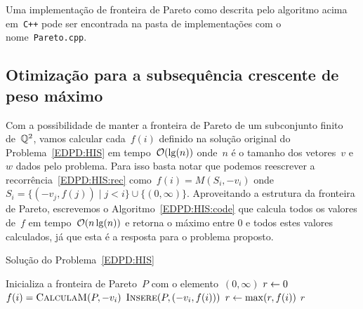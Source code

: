 Uma implementação de fronteira de Pareto como descrita pelo algoritmo acima em~\texttt{C++} pode ser encontrada na pasta de implementações com o nome~\texttt{Pareto.cpp}.



\subsection{Otimização para a subsequência crescente de peso máximo}

Com a possibilidade de manter a fronteira de Pareto de um subconjunto finito de~$\mathbb{Q}^2$, vamos calcular cada~$f(i)$ definido na solução original do Problema~\ref{EDPD:HIS} em tempo~$\mathcal{O}(\lg(n))$ onde~$n$ é o tamanho dos vetores~$v$ e~$w$ dados pelo problema. Para isso basta notar que podemos reescrever a recorrência~\eqref{EDPD:HIS:rec} como~$f(i) = M(S_i,-v_i)$ onde~$S_i = \{(-v_j,f(j)) \mid j < i\} \cup \{(0,\infty)\}$. Aproveitando a estrutura da fronteira de Pareto, escrevemos o Algoritmo~\ref{EDPD:HIS:code} que calcula todos os valores de~$f$ em tempo~$\mathcal{O}(n\lg(n))$ e retorna o máximo entre 0 e todos estes valores calculados, já que esta é a resposta para o problema proposto.

\begin{algorithm}[h]
\caption{Solução do Problema~\ref{EDPD:HIS}}
\label{EDPD:HIS:code}
\begin{algorithmic}[1]
    \State Inicializa a fronteira de Pareto~$P$ com o elemento~$(0,\infty)$
    \State $r \leftarrow 0$
        \State $f(i) = \textsc{CalculaM}(P,-v_i)$
        \State $\textsc{Insere}(P,(-v_i,f(i)))$
        \State $r \leftarrow \max(r,f(i))$
    \EndFor
    \State \Return $r$
\EndFunction
\end{algorithmic}
\end{algorithm}
